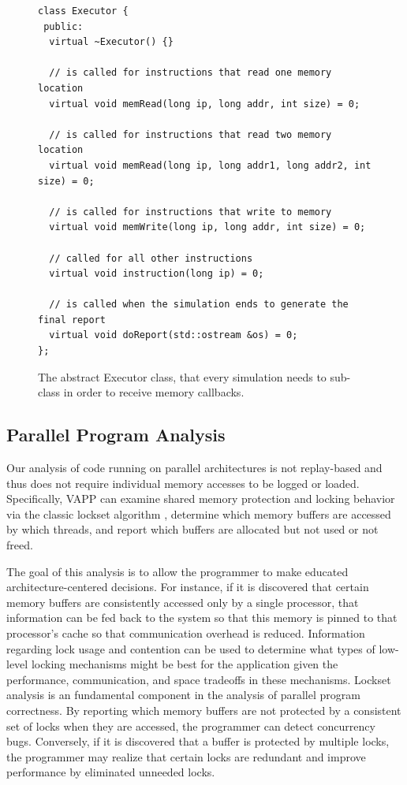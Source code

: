 \begin{figure}
  \lstset{
    language=C++,
    basicstyle=\small,
  }
  \begin{lstlisting}
class Executor {
 public:
  virtual ~Executor() {}

  // is called for instructions that read one memory location
  virtual void memRead(long ip, long addr, int size) = 0;

  // is called for instructions that read two memory location
  virtual void memRead(long ip, long addr1, long addr2, int size) = 0;

  // is called for instructions that write to memory
  virtual void memWrite(long ip, long addr, int size) = 0;

  // called for all other instructions
  virtual void instruction(long ip) = 0;

  // is called when the simulation ends to generate the final report
  virtual void doReport(std::ostream &os) = 0;
};
  \end{lstlisting}
  \caption{The abstract Executor class, that every simulation needs to
    sub-class in order to receive memory callbacks.}
  \label{fig:executor}
\end{figure}

\subsection{Parallel Program Analysis}
\label{sec:ppa}
Our analysis of code running on parallel architectures is
not replay-based and thus does not require individual memory
accesses to be logged or loaded.  Specifically, VAPP can
examine shared memory protection and locking behavior via
the classic lockset algorithm \cite{savage1997eraser},
determine which memory buffers are accessed by which threads,
and report which buffers are allocated but not used or not freed.

The goal of this analysis is to allow the programmer to make
educated architecture-centered decisions.  For instance, if
it is discovered that certain memory buffers are consistently
accessed only by a single processor, that information can be
fed back to the system so that this memory is pinned to that
processor's cache so that communication overhead is reduced.
Information regarding lock usage and contention can be
used to determine what types of low-level locking mechanisms
might be best for the application given the performance, 
communication, and space tradeoffs in these mechanisms.
Lockset analysis is an fundamental component in the analysis
of parallel program correctness. By reporting which
memory buffers are not protected by a consistent set of locks
when they are accessed, the programmer can detect concurrency
bugs. Conversely, if it is discovered that a buffer is
protected by multiple locks, the programmer may realize that
certain locks are redundant and improve performance by eliminated
unneeded locks.

